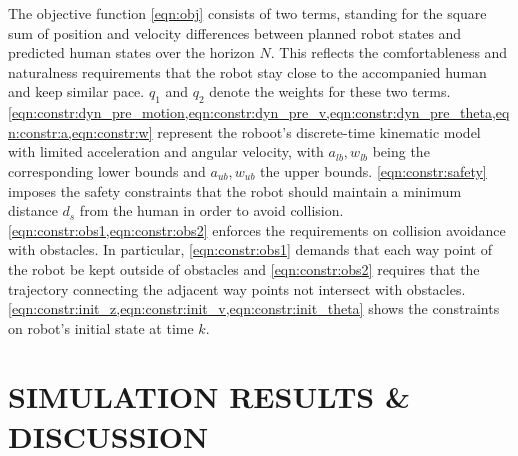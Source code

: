 \documentclass[letterpaper, 10 pt, conference]{ieeeconf}
\begin{document}
	The objective function \cref{eqn:obj} consists of two terms, standing for the square sum of position and velocity differences between planned robot states and predicted human states over the horizon $N$.
	This reflects the comfortableness and naturalness requirements that the robot stay close to the accompanied human and keep similar pace.
	$q_1$ and $q_2$ denote the weights for these two terms.
	\cref{eqn:constr:dyn_pre_motion,eqn:constr:dyn_pre_v,eqn:constr:dyn_pre_theta,eqn:constr:a,eqn:constr:w} represent the roboot's discrete-time kinematic model with limited acceleration and angular velocity, with $a_{lb},w_{lb}$ being the corresponding lower bounds and $a_{ub},w_{ub}$ the upper bounds.
	\cref{eqn:constr:safety} imposes the safety constraints that the robot should maintain a minimum distance $d_s$ from the human in order to avoid collision.
	\cref{eqn:constr:obs1,eqn:constr:obs2} enforces the requirements on collision avoidance with obstacles.
	In particular, \cref{eqn:constr:obs1} demands that each way point of the robot be kept outside of obstacles and \cref{eqn:constr:obs2} requires that the trajectory connecting the adjacent way points not intersect with obstacles.
	\cref{eqn:constr:init_z,eqn:constr:init_v,eqn:constr:init_theta} shows the constraints on robot's initial state at time $k$.
	
	
	\section{SIMULATION RESULTS \& DISCUSSION}\label{sec:results}
\end{document}
